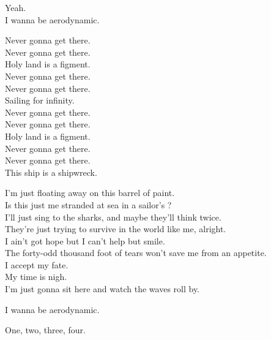 Yeah. \\
I wanna be aerodynamic. \\


Never gonna get there. \\
Never gonna get there. \\
Holy land is a figment. \\
Never gonna get there. \\
Never gonna get there. \\
Sailing for infinity. \\
Never gonna get there. \\
Never gonna get there. \\
Holy land is a figment. \\
Never gonna get there. \\
Never gonna get there. \\
This ship is a shipwreck. \\


I'm just floating away on this barrel of paint. \\
Is this just me stranded at sea in a sailor's ? \\
I'll just sing to the sharks, and maybe they'll think twice. \\
They're just trying to survive in the world like me, alright. \\
I ain't got hope but I can't help but smile. \\
The forty-odd thousand foot of tears won't save me from an appetite. \\
I accept my fate. \\
My time is nigh. \\
I'm just gonna sit here and watch the waves roll by. \\


I wanna be aerodynamic. \\





One, two, three, four. \\

